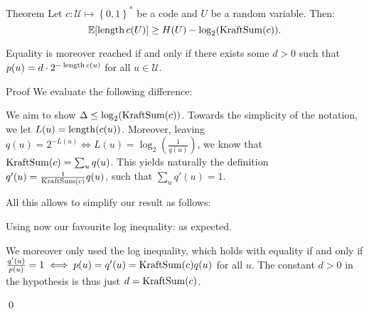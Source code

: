 \documentclass[a4paper]{article}
\begin{document}
\begin{parag}{Theorem}
    Let $c: \mathcal{U} \mapsto \left\{0, 1\right\}^*$ be a code and $U$ be a random variable. Then:
    \[\exval\left[\length c\left(U\right)\right] \geq H\left(U\right) - \log_2\left(\KraftSum\left(c\right)\right).\]

    Equality is moreover reached if and only if there exists some $d > 0$ such that  $p\left(u\right) = d\cdot  2^{-\length c\left(u\right)}$ for all $u \in \mathcal{U}$.
     
    \begin{subparag}{Proof}
        We evaluate the following difference: 

        We aim to show $\Delta \leq \log_2\left(\KraftSum\left(c\right)\right)$. Towards the simplicity of the notation, we let $L\left(u\right) = \length\left(c\left(u\right)\right)$. Moreover, leaving $q\left(u\right) = 2^{-L\left(u\right)} \iff L\left(u\right) = \log_2\left(\frac{1}{q\left(u\right)}\right)$, we know that $\KraftSum\left(c\right) = \sum_{u} q\left(u\right)$. This yields naturally the definition $q'\left(u\right) = \frac{1}{\KraftSum\left(c\right)} q\left(u\right)$, such that $\sum_{u} q'\left(u\right) = 1$.

        All this allows to simplify our result as follows:

        Using now our favourite log inequality: 
        as expected.

        We moreover only used the log inequality, which holds with equality if and only if $\frac{q'\left(u\right)}{p\left(u\right)} = 1 \iff p\left(u\right) = q'\left(u\right) = \KraftSum\left(c\right) q\left(u\right)$ for all $u$. The constant $d > 0$ in the hypothesis is thus just $d = \KraftSum\left(c\right)$.
        
        \qed
    \end{subparag}
\end{parag}
\end{document}
